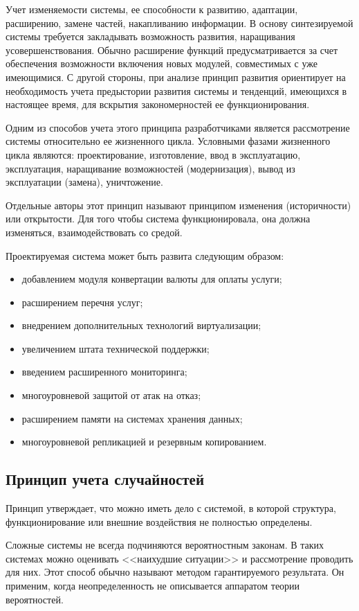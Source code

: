 Учет изменяемости системы, ее способности к развитию, адаптации, расширению, замене частей, накапливанию информации.
В основу синтезируемой системы требуется закладывать возможность развития, наращивания усовершенствования.
Обычно расширение функций предусматривается за счет обеспечения возможности включения новых модулей, совместимых с уже имеющимися.
С другой стороны, при анализе принцип развития ориентирует на необходимость учета предыстории развития системы и тенденций, имеющихся в настоящее время, для вскрытия закономерностей ее функционирования.

Одним из способов учета этого принципа разработчиками является рассмотрение системы относительно ее жизненного цикла.
Условными фазами жизненного цикла являются: проектирование, изготовление, ввод в эксплуатацию, эксплуатация, наращивание возможностей (модернизация), вывод из эксплуатации (замена), уничтожение.

Отдельные авторы этот принцип называют принципом изменения (историчности) или открытости.
Для того чтобы система функционировала, она должна изменяться, взаимодействовать со средой.

Проектируемая система может быть развита следующим образом:
\begin{itemize}
  \item добавлением модуля конвертации валюты для оплаты услуги;
  \item расширением перечня услуг;
  \item внедрением дополнительных технологий виртуализации;
  \item увеличением штата технической поддержки;
  \item введением расширенного мониторинга;
  \item многоуровневой защитой от атак на отказ;
  \item расширением памяти на системах хранения данных;
  \item многоуровневой репликацией и резервным копированием.
\end{itemize}

\subsection{Принцип учета случайностей}

Принцип утверждает, что можно иметь дело с системой, в которой структура, функционирование или внешние воздействия не полностью определены.

Сложные системы не всегда подчиняются вероятностным законам.
В таких системах можно оценивать <<наихудшие ситуации>> и рассмотрение проводить для них.
Этот способ обычно называют методом гарантируемого результата.
Он применим, когда неопределенность не описывается аппаратом теории вероятностей.

